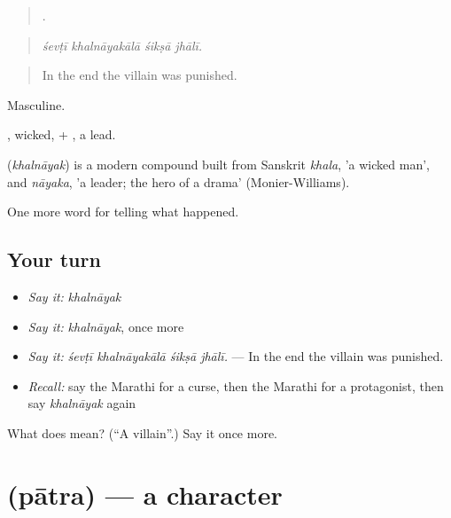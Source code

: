 \begin{quote}
   .
\end{quote}

\begin{quote}
\emph{śevṭī khalnāyakālā śikṣā jhālī.}
\end{quote}

\begin{quote}
In the end the villain was punished.
\end{quote}

Masculine.

, wicked, + , a lead.

\begin{cousinweb}
\textbf{} (\emph{khalnāyak}) is a modern compound built from Sanskrit \emph{khala}, 'a wicked man', and \emph{nāyaka}, 'a leader; the hero of a drama' (Monier-Williams).
\end{cousinweb}

\begin{grammarlens}[title={What you've built}]
One more word for telling what happened.
\end{grammarlens}

\subsection*{Your turn}
\begin{itemize}
\raggedright
  \item \emph{Say it:} \emph{khalnāyak}
  \item \emph{Say it:} \emph{khalnāyak}, once more
  \item \emph{Say it:} \emph{śevṭī khalnāyakālā śikṣā jhālī.} — In the end the villain was punished.
  \item \emph{Recall:} say the Marathi for a curse, then the Marathi for a protagonist, then say \emph{khalnāyak} again
\end{itemize}

\begin{tcolorbox}[breakable,colback=teal!4,colframe=teal!35!black,title={Before you move on}]
What does  mean? (\textquotedblleft{}A villain\textquotedblright{}.) Say it once more.
\end{tcolorbox}
\section[\texorpdfstring{\mr{पात्र} (pātra)}{पात्र (pātra)}]{ (pātra) — a character}

